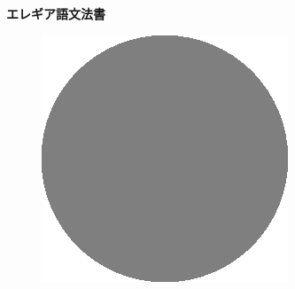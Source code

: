 \begin{titlepage}
  \begin{center}
    \vspace{12pt}
    {\large \textbf{エレギア語文法書}}
    \vspace{12pt}
    \begin{figure}[h]
      \begin{center}
        \includegraphics{emblem.eps}
      \end{center}
    \end{figure}
  \end{center}
\end{titlepage}
